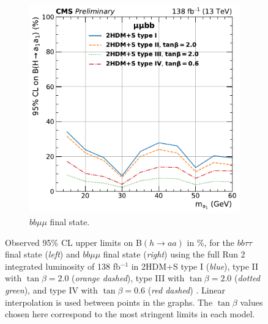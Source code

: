 \begin{figure}[ht]
\begin{subfigure}{0.45\textwidth}
    \includegraphics[width=1.0\textwidth]{figures/ch-10-results/HAA_bbmm_all_prelim.pdf}
      \caption{$bb\mu\mu$ final state.}
      \label{fig:bbmumu_only_limits}
  \end{subfigure}
  \caption[Observed 95\% CL upper limits on B$(h \rightarrow aa)$ in \%, for the $bb\tau\tau$ final state (\textit{left}) and $bb\mu\mu$ final state (\textit{right}) using the full Run 2 integrated luminosity of 138 fb$^{-1}$ in 2HDM+S type I (\textit{blue}), type II with $\tan\beta = 2.0$ (\textit{orange dashed}), type III with $\tan\beta = 2.0$ (\textit{dotted green}), and type IV with $\tan\beta = 0.6$ (\textit{red dashed}).]{Observed 95\% CL upper limits on B$(h \rightarrow aa)$ in \%, for the $bb\tau\tau$ final state (\textit{left}) and $bb\mu\mu$ final state (\textit{right}) using the full Run 2 integrated luminosity of 138 fb$^{-1}$ in 2HDM+S type I (\textit{blue}), type II with $\tan\beta = 2.0$ (\textit{orange dashed}), type III with $\tan\beta = 2.0$ (\textit{dotted green}), and type IV with $\tan\beta = 0.6$ (\textit{red dashed}) \cite{CMS-AN-20-213}. Linear interpolation is used between points in the graphs. The $\tan\beta$ values chosen here correspond to the most stringent limits in each model.}
  \label{fig:results_limits_bbtautau_bbmumu_separate}
\end{figure}

